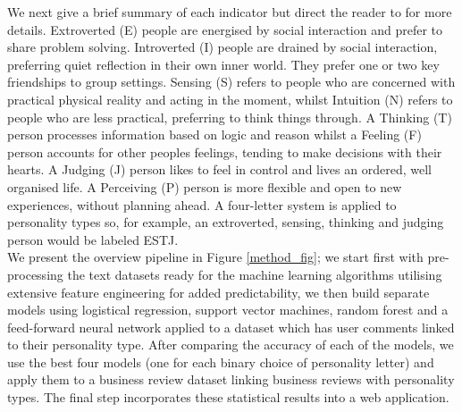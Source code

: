 \documentclass[sigconf, nonacm]{acmart}
\begin{document}
We next give a brief summary of each indicator but direct the reader to \cite{mccaulley1990myers} for more details. Extroverted (E) people are energised by social interaction and prefer to share problem solving. Introverted (I) people are drained by social interaction, preferring quiet reflection in their own inner world. They prefer one or two key friendships to group settings. Sensing (S) refers to people who are concerned with practical physical reality and acting in the moment, whilst Intuition (N) refers to people who are less practical, preferring to think things through. A Thinking (T) person processes information based on logic and reason whilst a Feeling (F) person accounts for other peoples feelings, tending to make decisions with their hearts. A Judging (J) person likes to feel in control and lives an ordered, well organised life. A Perceiving (P) person is more flexible and open to new experiences, without planning ahead. A four-letter system is applied to personality types so, for example, an extroverted, sensing, thinking and judging person would be labeled ESTJ. \\

We present the overview pipeline in Figure \ref{method_fig}; we start first with pre-processing the text datasets ready for the machine learning algorithms utilising extensive feature engineering for added predictability, we then build separate models using logistical regression, support vector machines, random forest and a feed-forward neural network applied to a dataset which has user comments linked to their personality type. After comparing the accuracy of each of the models, we use the best four models (one for each binary choice of personality letter) and apply them to a business review dataset linking business reviews with personality types. The final step incorporates these statistical results into a web application. 
\end{document}

